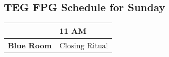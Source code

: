 
 \begin{center}
\section{TEG FPG Schedule for Sunday}

\begin{tabular}{|r|l|}
\hline
 & \textbf{11 AM} \\
\hline
\textbf{Blue Room} & Closing Ritual \\
\hline
\end{tabular}
\end{center}